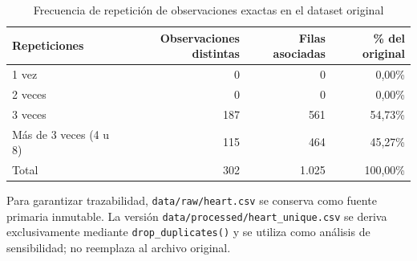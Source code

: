 \begin{table}[H]
  \centering
  \caption{Frecuencia de repetición de observaciones exactas en el dataset original}
  \label{tab:duplicados}
  \begin{tabular}{lrrr}
    \toprule
    Repeticiones & Observaciones distintas & Filas asociadas & \% del original \\
    \midrule
    1 vez & 0 & 0 & 0,00\% \\
    2 veces & 0 & 0 & 0,00\% \\
    3 veces & 187 & 561 & 54,73\% \\
    Más de 3 veces (4 u 8) & 115 & 464 & 45,27\% \\
    \midrule
    Total & 302 & 1.025 & 100,00\% \\
    \bottomrule
  \end{tabular}
\end{table}

Para garantizar trazabilidad, \texttt{data/raw/heart.csv} se conserva como fuente primaria inmutable. La versión \texttt{data/processed/heart\_unique.csv} se deriva exclusivamente mediante \texttt{drop\_duplicates()} y se utiliza como análisis de sensibilidad; no reemplaza al archivo original.
